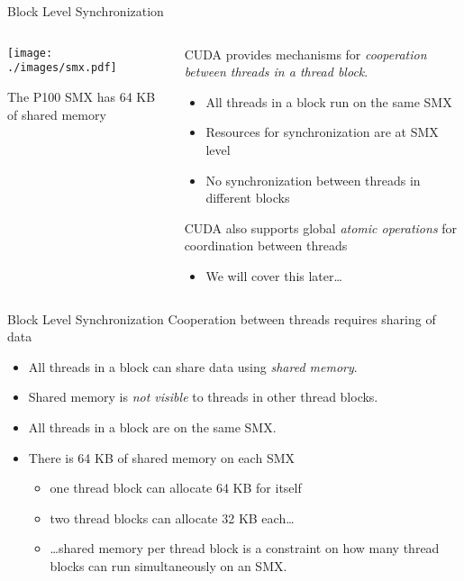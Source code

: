 \documentclass[aspectratio=43]{beamer}
\begin{document}
\begin{frame}[fragile]{Block Level Synchronization}
    \begin{columns}[T]
        \begin{column}{0.3\textwidth}
            \centering
            \texttt{[image: ./images/smx.pdf]}

            The P100 SMX has 64 KB of shared memory
        \end{column}

        \begin{column}{0.7\textwidth}
            CUDA provides mechanisms for \emph{cooperation between threads in a thread block}.
            \begin{itemize}
                \item All threads in a block run on the same SMX
                \item Resources for synchronization are at SMX level
                \item No synchronization between threads in different blocks
            \end{itemize}
            CUDA also supports global \emph{atomic operations} for coordination between threads
            \begin{itemize}
                \item We will cover this later\dots
            \end{itemize}
        \end{column}
    \end{columns}

\end{frame}

\begin{frame}[fragile]{Block Level Synchronization}
        Cooperation between threads requires sharing of data
        \begin{itemize}
            \item All threads in a block can share data using \emph{shared memory}.
            \item Shared memory is \emph{not visible} to threads in other thread blocks.
            \item All threads in a block are on the same SMX.
            \item There is 64 KB of shared memory on each SMX
            \begin{itemize}
                \item one thread block can allocate 64 KB for itself
                \item two thread blocks can allocate 32 KB each\dots
                \item \dots shared memory per thread block is a constraint on how many thread blocks can run simultaneously on an SMX.
            \end{itemize}
        \end{itemize}

\end{frame}
\end{document}
